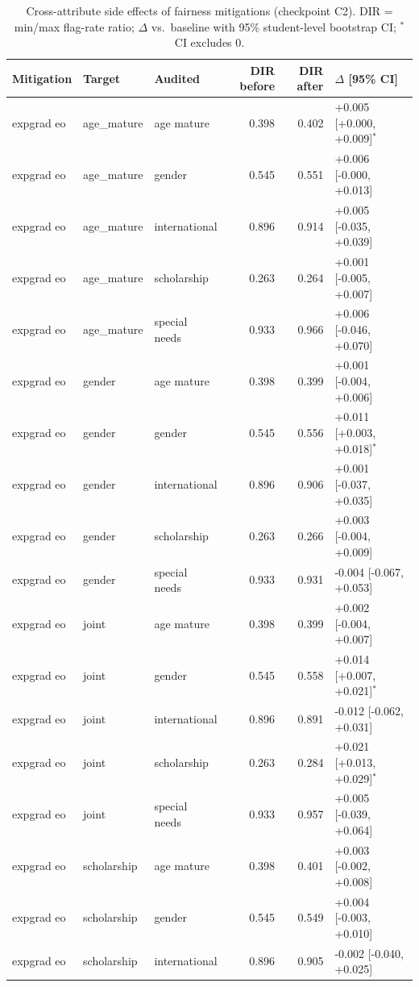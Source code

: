 \begin{table}[t]
\centering
\small
\caption{Cross-attribute side effects of fairness mitigations (checkpoint C2). DIR = min/max flag-rate ratio; $\Delta$ vs.\ baseline with 95\% student-level bootstrap CI; $^{*}$ CI excludes 0.}
\label{tab:uci697_side_effects}
\begin{tabular}{lllrrl}
\toprule
Mitigation & Target & Audited & DIR before & DIR after & $\Delta$ [95\% CI] \\
\midrule
expgrad eo & age_mature & age mature & 0.398 & 0.402 & +0.005 [+0.000, +0.009]$^{*}$ \\
expgrad eo & age_mature & gender & 0.545 & 0.551 & +0.006 [-0.000, +0.013] \\
expgrad eo & age_mature & international & 0.896 & 0.914 & +0.005 [-0.035, +0.039] \\
expgrad eo & age_mature & scholarship & 0.263 & 0.264 & +0.001 [-0.005, +0.007] \\
expgrad eo & age_mature & special needs & 0.933 & 0.966 & +0.006 [-0.046, +0.070] \\
expgrad eo & gender & age mature & 0.398 & 0.399 & +0.001 [-0.004, +0.006] \\
expgrad eo & gender & gender & 0.545 & 0.556 & +0.011 [+0.003, +0.018]$^{*}$ \\
expgrad eo & gender & international & 0.896 & 0.906 & +0.001 [-0.037, +0.035] \\
expgrad eo & gender & scholarship & 0.263 & 0.266 & +0.003 [-0.004, +0.009] \\
expgrad eo & gender & special needs & 0.933 & 0.931 & -0.004 [-0.067, +0.053] \\
expgrad eo & joint & age mature & 0.398 & 0.399 & +0.002 [-0.004, +0.007] \\
expgrad eo & joint & gender & 0.545 & 0.558 & +0.014 [+0.007, +0.021]$^{*}$ \\
expgrad eo & joint & international & 0.896 & 0.891 & -0.012 [-0.062, +0.031] \\
expgrad eo & joint & scholarship & 0.263 & 0.284 & +0.021 [+0.013, +0.029]$^{*}$ \\
expgrad eo & joint & special needs & 0.933 & 0.957 & +0.005 [-0.039, +0.064] \\
expgrad eo & scholarship & age mature & 0.398 & 0.401 & +0.003 [-0.002, +0.008] \\
expgrad eo & scholarship & gender & 0.545 & 0.549 & +0.004 [-0.003, +0.010] \\
expgrad eo & scholarship & international & 0.896 & 0.905 & -0.002 [-0.040, +0.025] \\

\end{tabular}
\end{table}
